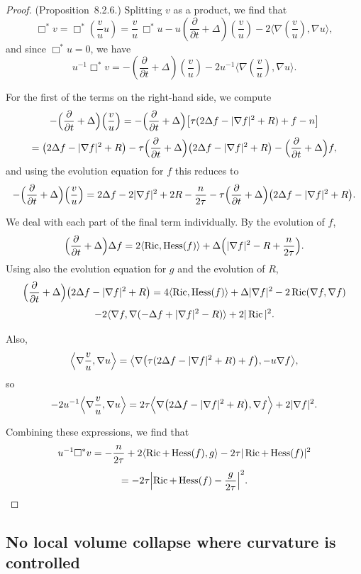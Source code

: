 \begin{proof}
(Proposition~8.2.6.) Splitting $v$ as a product, we find that
\[
\Box^{*} v = \Box^{*}\!\left(\frac{v}{u}u\right)
= \frac{v}{u}\,\Box^{*} u - u\!\left(\frac{\partial}{\partial t} + \Delta\right)\!\left(\frac{v}{u}\right)
- 2\langle \nabla\!\left(\frac{v}{u}\right), \nabla u\rangle,
\]
and since $\Box^{*}u = 0$, we have
\[
u^{-1}\Box^{*} v = -\left(\frac{\partial}{\partial t} + \Delta\right)\!\left(\frac{v}{u}\right)
- 2u^{-1}\langle \nabla\!\left(\frac{v}{u}\right), \nabla u\rangle.
\]

For the first of the terms on the right-hand side, we compute
\[
-\Bigl(\frac{\partial}{\partial t}+\Delta\Bigr)\Bigl(\frac vu\Bigr)
=-\Bigl(\frac{\partial}{\partial t}+\Delta\Bigr)\bigl[\tau(2\Delta f-|\nabla f|^{2}+R)+f-n\bigr]
\]
\[
=\bigl(2\Delta f-|\nabla f|^{2}+R\bigr)
-\tau\Bigl(\frac{\partial}{\partial t}+\Delta\Bigr)\bigl(2\Delta f-|\nabla f|^{2}+R\bigr)
-\Bigl(\frac{\partial}{\partial t}+\Delta\Bigr)f,
\]
and using the evolution equation for $f$ this reduces to
\[
-\Bigl(\frac{\partial}{\partial t}+\Delta\Bigr)\Bigl(\frac vu\Bigr)
=2\Delta f-2|\nabla f|^{2}+2R-\frac{n}{2\tau}
-\tau\Bigl(\frac{\partial}{\partial t}+\Delta\Bigr)\bigl(2\Delta f-|\nabla f|^{2}+R\bigr).
\]

We deal with each part of the final term individually. By the evolution of
$f$,
\[
\Bigl(\frac{\partial}{\partial t}+\Delta\Bigr)\Delta f
=2\langle \operatorname{Ric},\operatorname{Hess}(f)\rangle+\Delta\Bigl(|\nabla f|^{2}-R+\frac{n}{2\tau}\Bigr).
\]
Using also the evolution equation for $g$ and the evolution of $R$,
\[
\Bigl(\frac{\partial}{\partial t}+\Delta\Bigr)\bigl(2\Delta f-|\nabla f|^{2}+R\bigr)
=4\langle \operatorname{Ric},\operatorname{Hess}(f)\rangle+\Delta|\nabla f|^{2}-2\operatorname{Ric}(\nabla f,\nabla f)
\]
\[
-2\langle \nabla f,\nabla(-\Delta f+|\nabla f|^{2}-R)\rangle+2|\operatorname{Ric}|^{2}.
\]

Also,
\[
\Bigl\langle \nabla\frac vu,\nabla u\Bigr\rangle
=\bigl\langle \nabla\bigl(\tau(2\Delta f-|\nabla f|^{2}+R)+f\bigr),-u\nabla f\bigr\rangle,
\]
so
\[
-2u^{-1}\Bigl\langle\nabla\frac vu,\nabla u\Bigr\rangle
=2\tau\Bigl\langle\nabla\bigl(2\Delta f-|\nabla f|^{2}+R\bigr),\nabla f\Bigr\rangle+2|\nabla f|^{2}.
\]

Combining these expressions, we find that
\[
u^{-1}\Box^{*}v
=-\frac{n}{2\tau}+2\langle \operatorname{Ric}+\operatorname{Hess}(f),g\rangle-2\tau|\operatorname{Ric}+\operatorname{Hess}(f)|^{2}
\]
\[
=-2\tau\Bigl|\operatorname{Ric}+\operatorname{Hess}(f)-\frac{g}{2\tau}\Bigr|^{2}.
\]
\end{proof}

\subsection{No local volume collapse where curvature is controlled}

